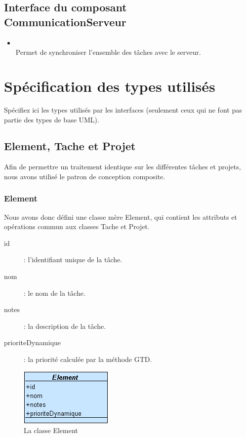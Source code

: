 	\subsection{Interface du composant CommunicationServeur}

		\begin{itemize}
			\item {} \\
			Permet de synchroniser l'ensemble des tâches avec le serveur.
		\end{itemize}

\section{Spécification des types utilisés}

Spécifiez ici les types utilisés par les interfaces (seulement ceux qui ne font pas partie des types de base UML).

\subsection{Element, Tache et Projet}

Afin de permettre un traitement identique sur les différentes tâches et projets, nous avons utilisé le patron de conception composite.

\subsubsection{Element}
Nous avons donc défini une classe mère Element, qui contient les attributs et opérations commun aux classes Tache et Projet.

	\begin{description}
		\item[id]: l'identifiant unique de la tâche.
		\item[nom]: le nom de la tâche.
		\item[notes]: la description de la tâche.
		\item[prioriteDynamique]: la priorité calculée par la méthode GTD.
	\end{description}

\begin{figure}[htbp]
	\centering
		\includegraphics[scale=1]{images/L3/structureDonnee/element.png}
	\caption{La classe Element}
	\label{fig:element}
\end{figure}

